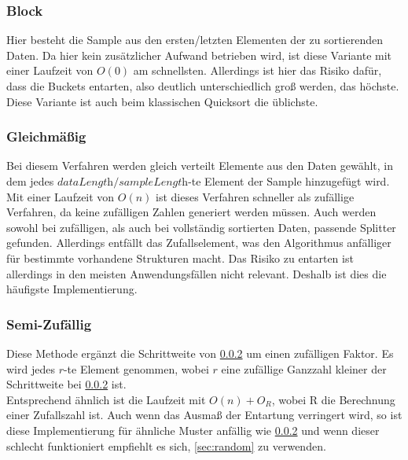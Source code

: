 		\subsubsection{Block}
			\label{sec:block}
			
			Hier besteht die Sample aus den ersten/letzten Elementen der zu sortierenden Daten.
			Da hier kein zusätzlicher Aufwand betrieben wird, ist diese Variante mit einer Laufzeit von $O(0)$ am schnellsten.
			Allerdings ist hier das Risiko dafür, dass die Buckets entarten, also deutlich unterschiedlich groß werden, das höchste.
			Diese Variante ist auch beim klassischen Quicksort die üblichste.

		\subsubsection{Gleichmäßig}
			\label{sec:even}
			
			Bei diesem Verfahren werden gleich verteilt Elemente aus den Daten gewählt, in dem jedes $\textit{dataLength}/\textit{sampleLength}$-te Element der Sample hinzugefügt wird.\\
			Mit einer Laufzeit von $O(n)$ ist dieses Verfahren schneller als zufällige Verfahren, da keine zufälligen Zahlen generiert werden müssen.
			Auch werden sowohl bei zufälligen, als auch bei vollständig sortierten Daten, passende Splitter gefunden.
			Allerdings entfällt das Zufallselement, was den Algorithmus anfälliger für bestimmte vorhandene Strukturen macht.
			Das Risiko zu entarten ist allerdings in den meisten Anwendungsfällen nicht relevant.
			Deshalb ist dies die häufigste Implementierung.

		\subsubsection{Semi-Zufällig}
			\label{sec:semi-random}
			
			Diese Methode ergänzt die Schrittweite von \ref{sec:even} um einen zufälligen Faktor.
			Es wird jedes $r$-te Element genommen, wobei $r$ eine zufällige Ganzzahl kleiner der Schrittweite bei \ref{sec:even} ist.\\
			Entsprechend ähnlich ist die Laufzeit mit $O(n)+O_R$, wobei R die Berechnung einer Zufallszahl ist.
			Auch wenn das Ausmaß der Entartung verringert wird, so ist diese Implementierung für ähnliche Muster anfällig wie \ref{sec:even} und wenn dieser schlecht funktioniert empfiehlt es sich, \ref{sec:random} zu verwenden.

